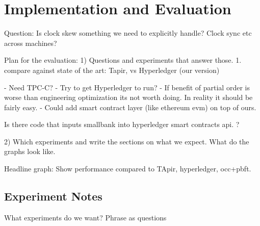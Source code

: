 \section{Implementation and Evaluation}
Question: Is clock skew something we need to explicitly handle? Clock sync etc across machines?

Plan for the evaluation:
1) Questions and experiments that answer those.
  1. compare against state of the art: Tapir, vs Hyperledger (our version)
  

- Need TPC-C?
- Try to get Hyperledger to run?
- If benefit of partial order is worse than engineering optimization its not worth doing. In reality it should be fairly easy.
- Could add smart contract layer (like ethereum evm) on top of ours.

Is there code that inputs smallbank into hyperledger smart contracts api. ?


2) Which experiments and write the sections on what we expect. What do the graphs look like.


Headline graph: Show performance compared to TApir, hyperledger, occ+pbft.

\subsection{Experiment Notes}
What experiments do we want? Phrase as questions

